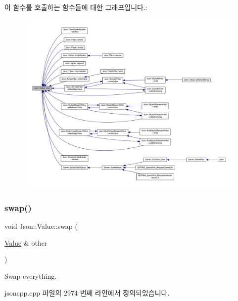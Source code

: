 이 함수를 호출하는 함수들에 대한 그래프입니다.\+:\nopagebreak
\begin{figure}[H]
\begin{center}
\leavevmode
\includegraphics[width=350pt]{class_json_1_1_value_a0ec2808e1d7efa4e9fad938d6667be44_icgraph}
\end{center}
\end{figure}
\mbox{\label{class_json_1_1_value_aab841120d78e296e1bc06a373345e822}} 
\subsubsection{\texorpdfstring{swap()}{swap()}}
{\footnotesize\ttfamily void Json\+::\+Value\+::swap (\begin{DoxyParamCaption}\item[{\hyperlink{class_json_1_1_value}{Value} \&}]{other }\end{DoxyParamCaption})}



Swap everything. 



jsoncpp.\+cpp 파일의 2974 번째 라인에서 정의되었습니다.


